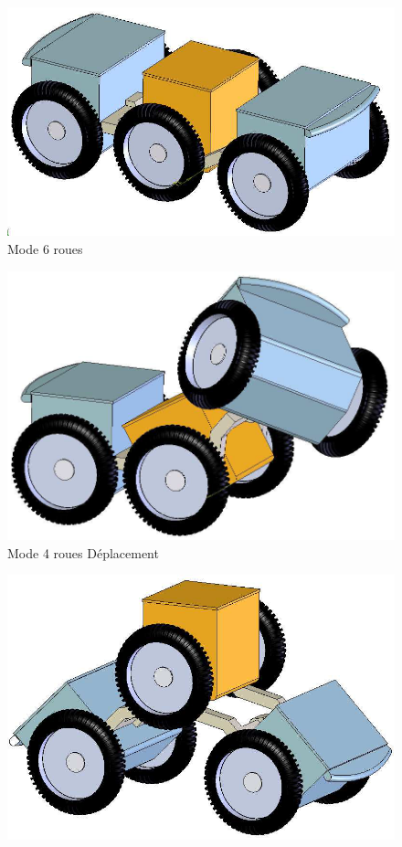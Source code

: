 \begin{figure}[htbp]
\begin{minipage}[c]{.32\linewidth}
\begin{center}
\includegraphics[width=\linewidth]{img/Robot2.png}
Mode 6 roues
\end{center}
\end{minipage}
\hfill
\begin{minipage}[c]{.32\linewidth}
\begin{center}
\includegraphics[width=\linewidth]{img/Robot3.png}
Mode 4 roues Déplacement
\end{center}
\end{minipage}
\hfill
\begin{minipage}[c]{.32\linewidth}
\begin{center}
\includegraphics[width=\linewidth]{img/Robot4.png}

\end{center}
\end{minipage}
\end{figure}
